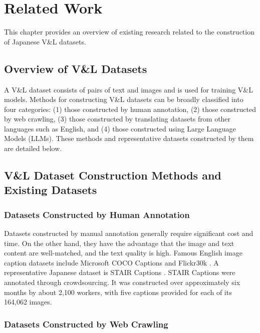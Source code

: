 \documentclass[11pt]{article}
\begin{document}
\section{Related Work}

This chapter provides an overview of existing research related to the construction of Japanese V\&L datasets.

\subsection{Overview of V\&L Datasets}

A V\&L dataset consists of pairs of text and images and is used for training V\&L models. Methods for constructing V\&L datasets can be broadly classified into four categories: (1) those constructed by human annotation, (2) those constructed by web crawling, (3) those constructed by translating datasets from other languages such as English, and (4) those constructed using Large Language Models (LLMs).
These methods and representative datasets constructed by them are detailed below.

\subsection{V\&L Dataset Construction Methods and Existing Datasets}

\subsubsection{Datasets Constructed by Human Annotation}

Datasets constructed by manual annotation generally require significant cost and time. On the other hand, they have the advantage that the image and text content are well-matched, and the text quality is high.
Famous English image caption datasets include Microsoft COCO Captions \cite{lin2014microsoft} and Flickr30k \cite{young2014image}. A representative Japanese dataset is STAIR Captions \cite{吉川友也2017stair}.
STAIR Captions were annotated through crowdsourcing. It was constructed over approximately six months by about 2,100 workers, with five captions provided for each of its 164,062 images.

\subsubsection{Datasets Constructed by Web Crawling}
\end{document}
